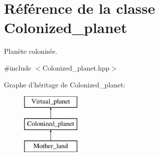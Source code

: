 \hypertarget{classColonized__planet}{\section{Référence de la classe Colonized\-\_\-planet}
\label{classColonized__planet}
}


Planète colonisée.  




{\ttfamily \#include $<$Colonized\-\_\-planet.\-hpp$>$}

Graphe d'héritage de Colonized\-\_\-planet\-:\begin{figure}[H]
\begin{center}
\leavevmode
\includegraphics[height=3.000000cm]{classColonized__planet}
\end{center}
\end{figure}
